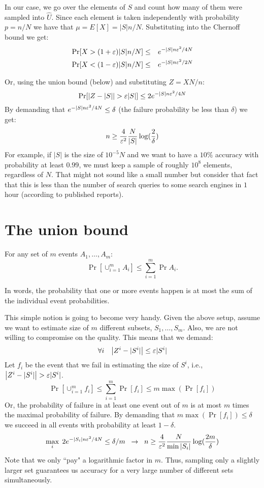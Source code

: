 \documentclass{article}
\begin{document}
In our case, we go over the elements of $S$ and count  
how many of them were sampled into $\hat{U}$.
Since each element is taken independently with probability $p = n/N$ we have that 
$\mu = E[X] = |S|n/N$. Substituting into the Chernoff bound we get:
\begin{eqnarray}
\Pr[X > (1+\varepsilon) |S|n/N] &\le& e^{-|S|n\varepsilon^2/4N}\\
\Pr[X < (1-\varepsilon) |S|n/N] &\le& e^{-|S|n\varepsilon^2/2N}
\end{eqnarray}

\noindent Or, using the union bound (below) and substituting  $Z = XN/n$:
\[
\Pr[\left| Z - |S| \right| > \varepsilon|S| ] \le 2 e^{-|S|n\varepsilon^2/4N}
\]
By demanding that $e^{-|S|n\varepsilon^2/4N} \le \delta$ (the failure probability be less than $\delta$) we get:
\[
n \ge \frac{4}{\varepsilon^2}\frac{N}{|S|}\log(\frac{2}{\delta})
\]
For example, if $|S|$ is the size of $10^{-5}N$ and we want to have a $10\%$ accuracy with probability at least $0.99$,
we must keep a sample of roughly $10^{8}$ elements, regardless of $N$. 
That might not sound like a small number but consider that fact that this is less than the number of search queries to some search engines in $1$ hour (according to published reports). 

\section{The union bound}
\begin{lemma}
For any set of $m$ events $A_1,\ldots,A_m$:
\[
\Pr[\cup_{i=1}^{m}A_i] \le \sum_{i=1}^{m}\Pr{A_i}.
\]
\end{lemma}
In words, the probability that one or more events happen is at most the sum of the 
individual event probabilities. 

This simple notion is going to become very handy. Given the above setup, assume we want to
estimate size of $m$ different subsets, $S_1,\ldots,S_m$.
Also, we are not willing to compromise on the quality. This means that we demand:
\[
\forall i \;\;\;\left| Z^i - |S^i| \right| \le \varepsilon|S^i| 
\]
Let $f_i$ be the event that we fail in estimating the size of $S^i$, i.e., $\left| Z^i - |S^i| \right| > \varepsilon|S^i|$.
\[
\Pr[\cup_{i=1}^{m}f_i] \le \sum_{i=1}^{m}\Pr[f_i] \le m \max(\Pr[f_i]) 
\]
Or, the probability of failure in at least one event out of $m$ is at most $m$ times the maximal probability of failure.
By demanding that $ m \max(\Pr[f_i]) \le \delta$ we succeed in all events with probability at least $1-\delta$.
\[
\max_i \; 2e^{-|S_i|n\varepsilon^2/4N} \le \delta/m \;\; \rightarrow \;\; n \ge \frac{4}{\varepsilon^2}\frac{N}{\min{|S_i|}}\log(\frac{2m}{\delta})
\]
Note that we only ``pay" a logarithmic factor in $m$.
Thus, sampling only a slightly larger set guarantees us accuracy for a very large number of
different sets simultaneously.
\end{document}
